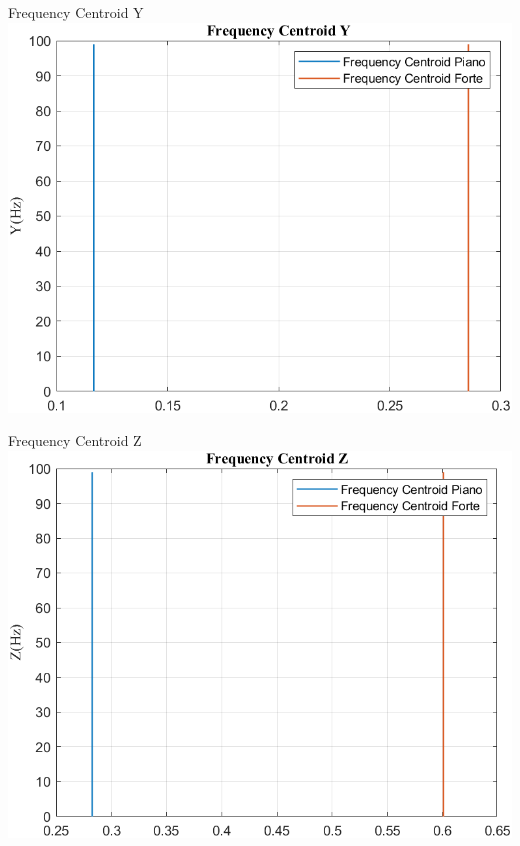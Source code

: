 	\begin{frame}{{Frequency Centroid Y}}
		\centering\includegraphics[height=.8\textheight]{figure/Acc/Trasformata/Frequency CentroidY}
	\end{frame}
	
	\begin{frame}{{Frequency Centroid Z}}
		\centering\includegraphics[height=.8\textheight]{figure/Acc/Trasformata/Frequency CentroidZ}
	\end{frame}
	
